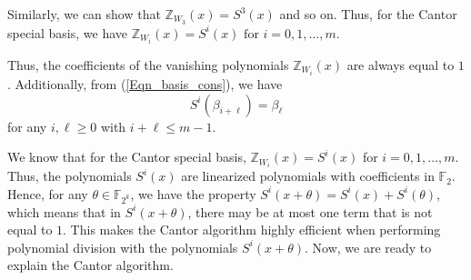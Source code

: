 
Similarly, we can show that $\mathbb{Z}_{W_{3}}(x)=S^{3}(x)$ and so on. Thus, for the Cantor special basis, we have $\mathbb{Z}_{W_{i}}(x)=S^{i}(x) \text{ for } i=0,1,\ldots,m$.



 Thus, the coefficients of the vanishing polynomials $\mathbb{Z}_{W_{i}}(x)$ are always equal to $1$. Additionally, from (\ref{Eqn_basis_cons}), we have 
 \begin{equation}\label{Eqn_basis_eval_beta}
	 S^{i}(\beta_{i+\ell}) = \beta_{\ell}
	 \end{equation}
 for any $i, \ell \geq 0$ with $i + \ell \leq m - 1$. 
  
  We know that for the Cantor special basis, $\mathbb{Z}_{W_{i}}(x) = S^{i}(x)$ for $i = 0, 1, \ldots, m$. Thus, the polynomials $S^{i}(x)$ are linearized polynomials with coefficients in $\mathbb{F}_{2}$. Hence, for any $\theta \in \mathbb{F}_{2^k}$, we have the property $S^{i}(x + \theta) = S^{i}(x) + S^{i}(\theta)$, which means that in $S^{i}(x + \theta)$, there may be at most one term that is not equal to $1$. This makes the Cantor algorithm highly efficient when performing polynomial division with the polynomials $S^{i}(x + \theta)$. Now, we are ready to explain the Cantor algorithm.
 

%

